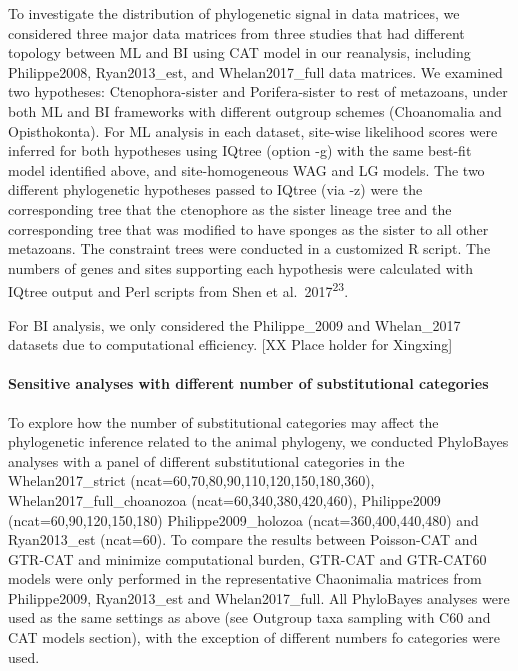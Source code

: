 \documentclass[]{article}
\let\oldparagraph\paragraph
\renewcommand{\paragraph}[1]{\oldparagraph{#1}\mbox{}}
\begin{document}
To investigate the distribution of phylogenetic signal in data matrices,
we considered three major data matrices from three studies that had
different topology between ML and BI using CAT model in our reanalysis,
including Philippe2008, Ryan2013\_est, and Whelan2017\_full data
matrices. We examined two hypotheses: Ctenophora-sister and
Porifera-sister to rest of metazoans, under both ML and BI frameworks
with different outgroup schemes (Choanomalia and Opisthokonta). For ML
analysis in each dataset, site-wise likelihood scores were inferred for
both hypotheses using IQtree (option -g) with the same best-fit model
identified above, and site-homogeneous WAG and LG models. The two
different phylogenetic hypotheses passed to IQtree (via -z) were the
corresponding tree that the ctenophore as the sister lineage tree and
the corresponding tree that was modified to have sponges as the sister
to all other metazoans. The constraint trees were conducted in a
customized R script. The numbers of genes and sites supporting each
hypothesis were calculated with IQtree output and Perl scripts from Shen
et al.~2017\textsuperscript{23}.

For BI analysis, we only considered the Philippe\_2009 and Whelan\_2017
datasets due to computational efficiency. {[}XX Place holder for
Xingxing{]}

\hypertarget{sensitive-analyses-with-different-number-of-substitutional-categories}{%
\paragraph{Sensitive analyses with different number of substitutional
categories}\label{sensitive-analyses-with-different-number-of-substitutional-categories}}

To explore how the number of substitutional categories may affect the
phylogenetic inference related to the animal phylogeny, we conducted
PhyloBayes analyses with a panel of different substitutional categories
in the Whelan2017\_strict (ncat=60,70,80,90,110,120,150,180,360),
Whelan2017\_full\_choanozoa (ncat=60,340,380,420,460), Philippe2009
(ncat=60,90,120,150,180) Philippe2009\_holozoa (ncat=360,400,440,480)
and Ryan2013\_est (ncat=60). To compare the results between Poisson-CAT
and GTR-CAT and minimize computational burden, GTR-CAT and GTR-CAT60
models were only performed in the representative Chaonimalia matrices
from Philippe2009, Ryan2013\_est and Whelan2017\_full. All PhyloBayes
analyses were used as the same settings as above (see Outgroup taxa
sampling with C60 and CAT models section), with the exception of
different numbers fo categories were used.
\end{document}
